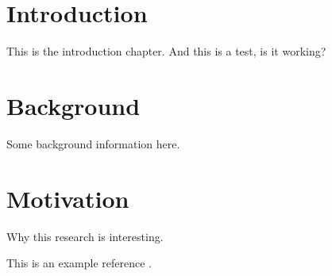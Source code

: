 \section{Introduction}
This is the introduction chapter. And this is a test, is it working?

\section{Background}
Some background information here.

\section{Motivation}
Why this research is interesting.

This is an example reference \cite{riviere2008}.

